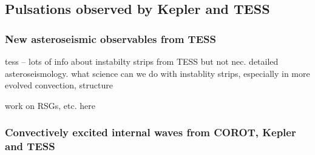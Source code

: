 {\color{blue}
\subsection{Pulsations observed by Kepler and TESS}



\subsubsection{New asteroseismic observables from TESS}

tess -- lots of info about instabilty strips from TESS but not nec. detailed asteroseismology.  what science can we do with instablity strips, especially in more evolved   convection, structure

work on RSGs, etc. here

\subsubsection{Convectively excited internal waves from COROT, Kepler and TESS}


}